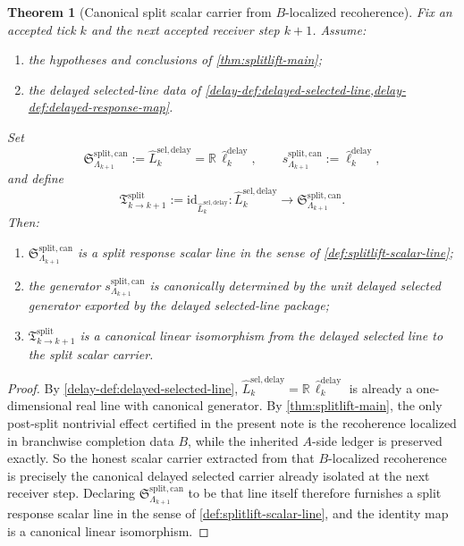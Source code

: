 \documentclass[11pt]{article}
\theoremstyle{definition}
\theoremstyle{plain}
\newtheorem{theorem}[definition]{Theorem}
\theoremstyle{remark}
\newcommand{\1}{\mathbf 1}
\begin{document}
\begin{theorem}[Canonical split scalar carrier from \(B\)-localized recoherence]
\label{thm:splitlift-canonical-scalar-carrier}
Fix an accepted tick \(k\) and the next accepted receiver step \(k+1\).
Assume:
\begin{enumerate}[leftmargin=2em]
\item the hypotheses and conclusions of \cref{thm:splitlift-main};
\item the delayed selected-line data of
  \cref{delay-def:delayed-selected-line,delay-def:delayed-response-map}.
\end{enumerate}
Set
\[
\mathfrak S^{\mathrm{split,can}}_{\Lambda_{k+1}}
:=
\widehat L^{\mathrm{sel,delay}}_k
=
\mathbb R\,\widehat\ell^{\mathrm{delay}}_k,
\qquad
s^{\mathrm{split,can}}_{\Lambda_{k+1}}
:=
\widehat\ell^{\mathrm{delay}}_k,
\]
and define
\[
\mathfrak T^{\mathrm{split}}_{k\to k+1}
:=
\mathrm{id}_{\widehat L^{\mathrm{sel,delay}}_k}
:
\widehat L^{\mathrm{sel,delay}}_k
\longrightarrow
\mathfrak S^{\mathrm{split,can}}_{\Lambda_{k+1}}.
\]
Then:
\begin{enumerate}[leftmargin=2em]
\item
  \(
  \mathfrak S^{\mathrm{split,can}}_{\Lambda_{k+1}}
  \)
  is a split response scalar line in the sense of \cref{def:splitlift-scalar-line};
\item the generator
  \(
  s^{\mathrm{split,can}}_{\Lambda_{k+1}}
  \)
  is canonically determined by the unit delayed selected generator exported by the delayed
  selected-line package;
\item
  \(
  \mathfrak T^{\mathrm{split}}_{k\to k+1}
  \)
  is a canonical linear isomorphism from the delayed selected line to the split scalar carrier.
\end{enumerate}
\end{theorem}

\begin{proof}
By \cref{delay-def:delayed-selected-line},
\(
\widehat L^{\mathrm{sel,delay}}_k
=
\mathbb R\,\widehat\ell^{\mathrm{delay}}_k
\)
is already a one-dimensional real line with canonical generator.
By \cref{thm:splitlift-main}, the only post-split nontrivial effect certified in the present note is
the recoherence localized in branchwise completion data \(B\), while the inherited \(A\)-side ledger
is preserved exactly.
So the honest scalar carrier extracted from that \(B\)-localized recoherence is precisely the
canonical delayed selected carrier already isolated at the next receiver step.
Declaring
\(
\mathfrak S^{\mathrm{split,can}}_{\Lambda_{k+1}}
\)
to be that line itself therefore furnishes a split response scalar line in the sense of
\cref{def:splitlift-scalar-line}, and the identity map is a canonical linear isomorphism.
\end{proof}
\end{document}
